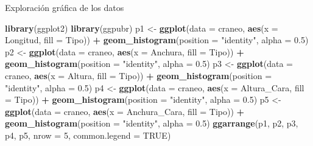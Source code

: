 \documentclass[ignorenonframetext,]{beamer}
\newenvironment{Shaded}{\begin{snugshade}}{\end{snugshade}}
\newcommand{\KeywordTok}[1]{\textcolor[rgb]{0.13,0.29,0.53}{\textbf{#1}}}
\newcommand{\DataTypeTok}[1]{\textcolor[rgb]{0.13,0.29,0.53}{#1}}
\newcommand{\DecValTok}[1]{\textcolor[rgb]{0.00,0.00,0.81}{#1}}
\newcommand{\FloatTok}[1]{\textcolor[rgb]{0.00,0.00,0.81}{#1}}
\newcommand{\StringTok}[1]{\textcolor[rgb]{0.31,0.60,0.02}{#1}}
\newcommand{\OtherTok}[1]{\textcolor[rgb]{0.56,0.35,0.01}{#1}}
\newcommand{\OperatorTok}[1]{\textcolor[rgb]{0.81,0.36,0.00}{\textbf{#1}}}
\newcommand{\NormalTok}[1]{#1}
\begin{document}
\begin{frame}[fragile]{Exploración gráfica de los datos}

\begin{Shaded}
\begin{Highlighting}[]
\KeywordTok{library}\NormalTok{(ggplot2)}
\KeywordTok{library}\NormalTok{(ggpubr)}
\NormalTok{p1 <-}\StringTok{ }\KeywordTok{ggplot}\NormalTok{(}\DataTypeTok{data =}\NormalTok{ craneo, }\KeywordTok{aes}\NormalTok{(}\DataTypeTok{x =}\NormalTok{ Longitud, }\DataTypeTok{fill =}\NormalTok{ Tipo)) }\OperatorTok{+}
\StringTok{  }\KeywordTok{geom_histogram}\NormalTok{(}\DataTypeTok{position =} \StringTok{"identity"}\NormalTok{, }\DataTypeTok{alpha =} \FloatTok{0.5}\NormalTok{)}
\NormalTok{p2 <-}\StringTok{ }\KeywordTok{ggplot}\NormalTok{(}\DataTypeTok{data =}\NormalTok{ craneo, }\KeywordTok{aes}\NormalTok{(}\DataTypeTok{x =}\NormalTok{ Anchura, }\DataTypeTok{fill =}\NormalTok{ Tipo)) }\OperatorTok{+}
\StringTok{  }\KeywordTok{geom_histogram}\NormalTok{(}\DataTypeTok{position =} \StringTok{"identity"}\NormalTok{, }\DataTypeTok{alpha =} \FloatTok{0.5}\NormalTok{)}
\NormalTok{p3 <-}\StringTok{ }\KeywordTok{ggplot}\NormalTok{(}\DataTypeTok{data =}\NormalTok{ craneo, }\KeywordTok{aes}\NormalTok{(}\DataTypeTok{x =}\NormalTok{ Altura, }\DataTypeTok{fill =}\NormalTok{ Tipo)) }\OperatorTok{+}
\StringTok{  }\KeywordTok{geom_histogram}\NormalTok{(}\DataTypeTok{position =} \StringTok{"identity"}\NormalTok{, }\DataTypeTok{alpha =} \FloatTok{0.5}\NormalTok{)}
\NormalTok{p4 <-}\StringTok{ }\KeywordTok{ggplot}\NormalTok{(}\DataTypeTok{data =}\NormalTok{ craneo, }\KeywordTok{aes}\NormalTok{(}\DataTypeTok{x =}\NormalTok{ Altura_Cara, }\DataTypeTok{fill =}\NormalTok{ Tipo)) }\OperatorTok{+}
\StringTok{  }\KeywordTok{geom_histogram}\NormalTok{(}\DataTypeTok{position =} \StringTok{"identity"}\NormalTok{, }\DataTypeTok{alpha =} \FloatTok{0.5}\NormalTok{)}
\NormalTok{p5 <-}\StringTok{ }\KeywordTok{ggplot}\NormalTok{(}\DataTypeTok{data =}\NormalTok{ craneo, }\KeywordTok{aes}\NormalTok{(}\DataTypeTok{x =}\NormalTok{ Anchura_Cara, }\DataTypeTok{fill =}\NormalTok{ Tipo)) }\OperatorTok{+}
\StringTok{  }\KeywordTok{geom_histogram}\NormalTok{(}\DataTypeTok{position =} \StringTok{"identity"}\NormalTok{, }\DataTypeTok{alpha =} \FloatTok{0.5}\NormalTok{)}
\KeywordTok{ggarrange}\NormalTok{(p1, p2, p3, p4, p5, }\DataTypeTok{nrow =} \DecValTok{5}\NormalTok{, }\DataTypeTok{common.legend =} \OtherTok{TRUE}\NormalTok{)}
\end{Highlighting}
\end{Shaded}

\end{frame}
\end{document}
